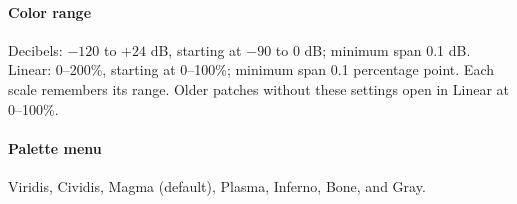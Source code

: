 \paragraph{Color range}
Decibels: $-120$ to $+24$ dB, starting at $-90$ to 0 dB; minimum span
0.1 dB. Linear: 0--200\%, starting at 0--100\%; minimum span 0.1 percentage
point. Each scale remembers its range. Older patches without these settings
open in Linear at 0--100\%.

\paragraph{Palette menu}
Viridis, Cividis, Magma (default), Plasma, Inferno, Bone, and Gray.
